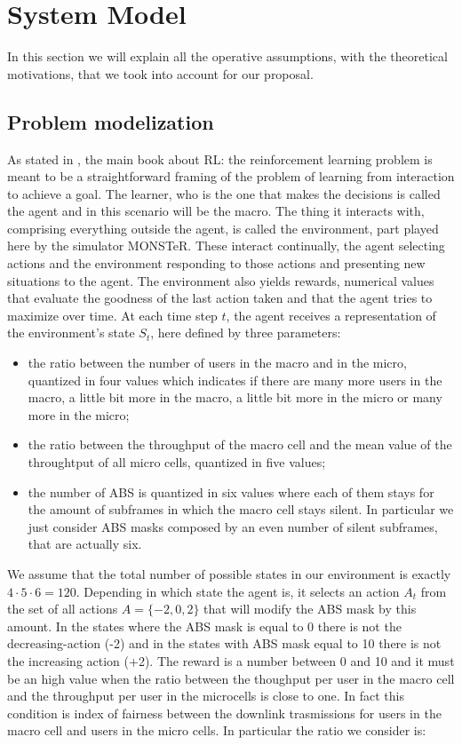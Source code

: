 \documentclass[conference,10pt]{IEEEtran}
\begin{document}
\section{System Model}\label{sec:symo}
In this section we will explain all the operative assumptions, with the theoretical motivations, that we took into account for our proposal.
\subsection{Problem modelization}
As stated in \cite{sutton1998reinforcement}, the main book about RL: the reinforcement learning problem is meant to be a straightforward framing of the problem of learning from interaction to achieve a goal. The learner, who is the one that makes the decisions is called the agent and in this scenario will be the macro. The thing it interacts with, comprising everything outside the agent, is called the environment, part played here by the simulator MONSTeR. These interact continually, the agent selecting actions and the environment responding to those actions and presenting new situations to the agent. The environment also yields rewards, numerical values that evaluate the goodness of the last action taken and that the agent tries to maximize over time. At each time step $t$, the agent receives a representation of the environment's state $S_t$, here defined by three parameters:
\begin{itemize}
\item the ratio between the number of users in the macro and in the micro, quantized in four values which indicates if there are many more users in the macro, a little bit more in the macro, a little bit more in the micro or many more in the micro;
\item the ratio between the throughput of the macro cell and the mean value of the throughtput of all micro cells, quantized in five values;
\item the number of ABS is quantized in six values where each of them stays for the amount of subframes in which the macro cell stays silent. In particular we just consider ABS masks composed by an even number of silent subframes, that are actually six.
\end{itemize}
We assume that the total number of possible states in our environment is exactly $4\cdot 5\cdot 6=120$. Depending in which state the agent is, it selects an action $A_t$ from the set of all actions $A=\lbrace-2,0,2\rbrace$ that will modify the ABS mask by this amount. In the states where the ABS mask is equal to 0 there is not the decreasing-action (-2) and in the states with ABS mask equal to 10 there is not the increasing action (+2). The reward is a number between 0 and 10 and it must be an high value when the ratio between the thoughput per user in the macro cell and the throughput per user in the microcells is close to one. In fact this condition is index of fairness between the downlink trasmissions for users in the macro cell and users in the micro cells. In particular the ratio we consider is: 
\end{document}
